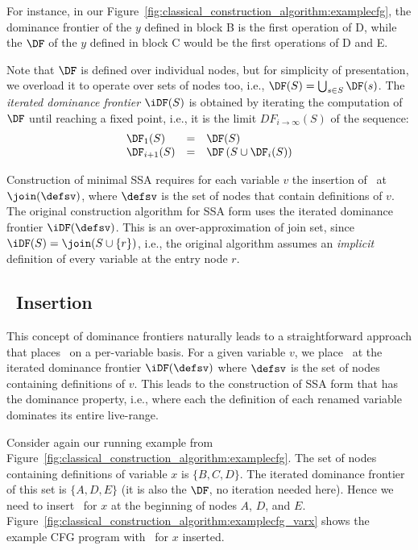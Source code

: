 {For instance, in our 
Figure~\ref{fig:classical_construction_algorithm:examplecfg}, the dominance 
frontier of the $y$ defined in block B is the first operation of D, while the 
$\DF$ of the $y$ defined in block C would be the first operations 
of D and E.


Note that $\DF$ is defined over individual nodes, 
but for simplicity of presentation, we overload it to 
operate over sets of nodes too, i.e., 
$\DF(S) = \bigcup_{s\in S} \DF(s)$.
The \textit{iterated dominance frontier} $\iDF(S)$ is obtained by iterating the computation of $\DF$ until 
reaching a fixed point, i.e., it is the limit 
$DF_{i\rightarrow\infty}(S)$
of the sequence:
$$\begin{array}{lll}
\DF_1(S) & = & \DF(S)\\
\DF_{i+1}(S) & = & \DF\left(S\cup \DF_i(S)\right)
\end{array}$$


Construction of minimal SSA 
requires for each variable $v$ the insertion of \phifuns\ at $\join(\defsv)$,
where $\defsv$ is the set of nodes that contain definitions of $v$.
The original construction algorithm
for SSA form uses the iterated dominance frontier $\iDF(\defsv)$.
This is an over-approximation of join set, since
$\iDF(S)=\join(S\cup \{r\})$,
i.e., the original algorithm assumes an \emph{implicit} definition of every
variable at the entry node $r$.


\subsection{\phifun\ Insertion}
\label{sec:classical_construction_algorithm:phiinsertion}
This concept of dominance frontiers 
naturally leads to a
straightforward approach that places \phifuns\
on a per-variable basis.
For a given variable $v$, we place \phifuns\ at the
iterated dominance frontier $\iDF(\defsv)$ where
$\defsv$ is the set of nodes containing definitions of $v$.
This leads to the construction of SSA form that has 
the dominance property, i.e., where each the 
definition of each renamed variable dominates its entire live-range.

Consider again our running example from Figure~\ref{fig:classical_construction_algorithm:examplecfg}. The set of nodes containing definitions
of variable
$x$ is $\{ B,C,D \}$. The iterated dominance frontier of this set 
is $\{ A, D, E \}$ (it is also the $\DF$, no iteration needed here). Hence we need to insert 
\phifuns\ for $x$ at the beginning of nodes $A$, $D$, and $E$.
Figure~\ref{fig:classical_construction_algorithm:examplecfg_varx} shows the example CFG program
with \phifuns\ for $x$ inserted.

}
